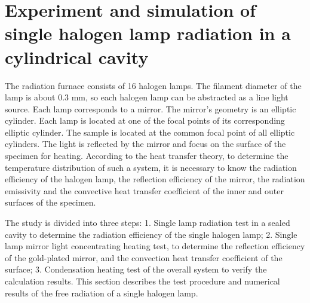 \section{Experiment and simulation of single halogen lamp radiation in a cylindrical cavity}

The radiation furnace consists of 16 halogen lamps. The filament diameter of the lamp is about 0.3 mm, so each halogen lamp can be abstracted as a line light source.
Each lamp corresponds to a mirror. The mirror's geometry is an elliptic cylinder. Each lamp is located at one of the focal points of its corresponding elliptic cylinder. The sample is located at the common focal point of all elliptic cylinders. The light is reflected by the mirror and focus on the surface of the specimen for heating.
According to the heat transfer theory, to determine the temperature distribution of such a system, it is necessary to know the radiation efficiency of the halogen lamp, the reflection efficiency of the mirror, the radiation emissivity and the convective heat transfer coefficient of the inner and outer surfaces of the specimen.

The study is divided into three steps:
1. Single lamp radiation test in a sealed cavity to determine the radiation efficiency of the single halogen lamp;
2. Single lamp mirror light concentrating heating test, to determine the reflection efficiency of the gold-plated mirror, and the convection heat transfer coefficient of the surface;
3. Condensation heating test of the overall system to verify the calculation results.
This section describes the test procedure and numerical results of the free radiation of a single halogen lamp.

